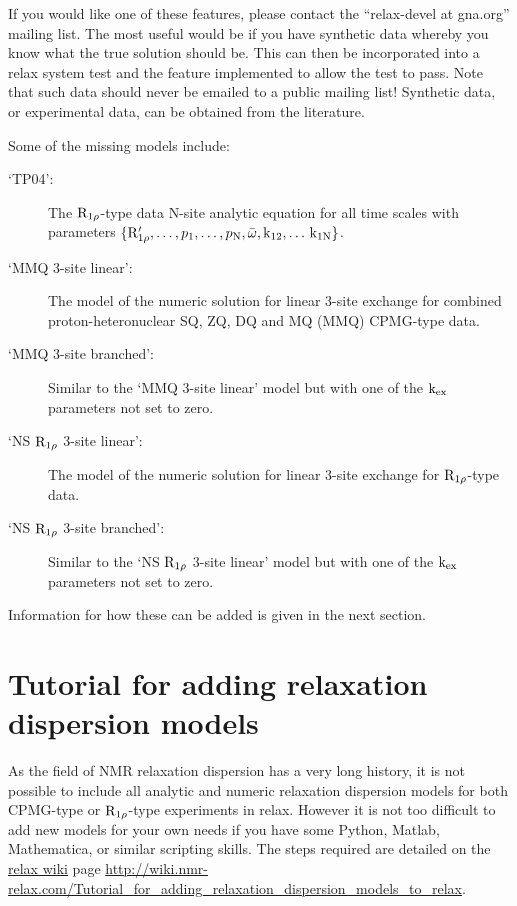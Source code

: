 If you would like one of these features, please contact the ``relax-devel at gna.org'' mailing list.
The most useful would be if you have synthetic data whereby you know what the true solution should be.
This can then be incorporated into a relax system test and the feature implemented to allow the test to pass.
Note that such data should never be emailed to a public mailing list!
Synthetic data, or experimental data, can be obtained from the literature.

Some of the missing models include:
\begin{description}
\item[`TP04':]  The $\mathrm{R}_{1\rho}$-type data \citet{TrottPalmer04} N-site analytic equation for all time scales with parameters $\{\mathrm{R}_{1\rho}', \dots, p_\textrm{1}, \dots, p_\textrm{N}, \bar\omega, \textrm{k}_\textrm{12}, \dots\, \textrm{k}_\textrm{1N}\}$.
\item[`MMQ 3-site linear':]  The model of the numeric solution for linear 3-site exchange for combined proton-heteronuclear SQ, ZQ, DQ and MQ (MMQ) CPMG-type data.
\item[`MMQ 3-site branched':]  Similar to the `MMQ 3-site linear' model but with one of the $\textrm{k}_\textrm{ex}$ parameters not set to zero.
\item[`NS $\mathrm{R}_{1\rho}$ 3-site linear':]  The model of the numeric solution for linear 3-site exchange for $\mathrm{R}_{1\rho}$-type data.
\item[`NS $\mathrm{R}_{1\rho}$ 3-site branched':]  Similar to the `NS $\mathrm{R}_{1\rho}$ 3-site linear' model but with one of the $\textrm{k}_\textrm{ex}$ parameters not set to zero.
\end{description}

Information for how these can be added is given in the next section.



\section{Tutorial for adding relaxation dispersion models}
\label{sect: dispersion: model tutorial}

As the field of NMR relaxation dispersion has a very long history, it is not possible to include all analytic and numeric relaxation dispersion models for both CPMG-type or $\mathrm{R}_{1\rho}$-type experiments in relax.  However it is not too difficult to add new models for your own needs if you have some Python, Matlab, Mathematica, or similar scripting skills.  The steps required are detailed on the \href{http://wiki.nmr-relax.com/}{relax wiki} page \url{http://wiki.nmr-relax.com/Tutorial\_for\_adding\_relaxation\_dispersion\_models\_to\_relax}.



